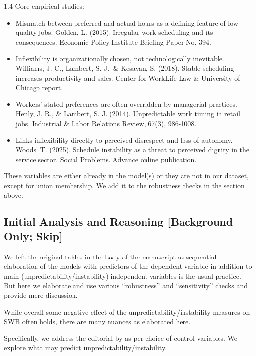 \documentclass[10pt, letterpaper]{article}
\begin{document}
\begin{spacing}{1.4}
Core empirical studies:
\begin{itemize}
\item Mismatch between preferred and actual hours as a defining feature of low-quality jobs. Golden, L. (2015). Irregular work scheduling and its consequences. Economic Policy Institute Briefing Paper No. 394.
\item Inflexibility is organizationally chosen, not technologically inevitable. Williams, J. C., Lambert, S. J., \& Kesavan, S. (2018). Stable scheduling increases productivity and sales. Center for WorkLife Law \& University of Chicago report.
\item Workers' stated preferences are often overridden by managerial practices. Henly, J. R., \& Lambert, S. J. (2014). Unpredictable work timing in retail jobs. Industrial \& Labor Relations Review, 67(3), 986-1008.
\item Links inflexibility directly to perceived disrespect and loss of autonomy. Woods, T. (2025). Schedule instability as a threat to perceived dignity in the service sector. Social Problems. Advance online publication.
\end{itemize}

These variables are either already in the model(s) or they are not in our dataset, except for union membership. We add it to the robustness checks in the section above.

\subsection{Initial Analysis and Reasoning [Background Only; Skip]}

We left the original tables in the body of the manuscript as sequential elaboration of the models with predictors of the dependent variable in addition to main (unpredictability/instability) independent variables is the usual practice. But here we elaborate and use various ``robustness'' and ``sensitivity'' checks and
provide more discussion.

While overall some negative effect of the unpredictability/instability measures on SWB
often holds, there are many nuances as elaborated here. 

Specifically, we address the editorial by \citet{bartram24} as per choice of control
variables. We explore what may predict unpredictability/instability.


\end{spacing}
\end{document}
